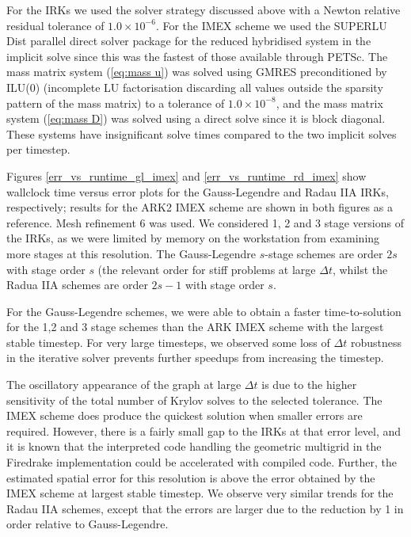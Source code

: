 \documentclass[a4paper, 12pt]{article}
\begin{document}
For the IRKs we used the solver strategy discussed above with a Newton
relative residual tolerance of $1.0\times 10^{-6}$. For the IMEX
scheme we used the SUPERLU Dist parallel direct solver package
\citep{li2023newly,li2003superlu_dist} for the reduced hybridised
system in the implicit solve since this was the fastest of those
available through PETSc. The mass matrix system (\ref{eq:mass u}) was
solved using GMRES preconditioned by ILU(0) (incomplete LU
factorisation discarding all values outside the sparsity pattern of
the mass matrix) to a tolerance of $1.0\times 10^{-8}$, and the mass
matrix system (\ref{eq:mass D}) was solved using a direct solve since
it is block diagonal. These systems have insignificant solve times
compared to the two implicit solves per timestep.

Figures \ref{err_vs_runtime_gl_imex} and \ref{err_vs_runtime_rd_imex}
show wallclock time versus error plots for the Gauss-Legendre and
Radau IIA IRKs, respectively; results for the ARK2 IMEX scheme are
shown in both figures as a reference. Mesh refinement 6 was used. We
considered 1, 2 and 3 stage versions of the IRKs, as we were limited
by memory on the workstation from examining more stages at this
resolution. The Gauss-Legendre $s$-stage schemes are order $2s$ with
stage order $s$ (the relevant order for stiff problems at large
$\Delta t$, whilst the Radua IIA schemes are order $2s-1$ with stage
order $s$.

For the Gauss-Legendre schemes, we were able to obtain a faster
time-to-solution for the 1,2 and 3 stage schemes than the ARK IMEX
scheme with the largest stable timestep.  For very large timesteps, we
observed some loss of $\Delta t$ robustness in the iterative solver
prevents further speedups from increasing the timestep.

The
oscillatory appearance of the graph at large $\Delta t$ is due to the
higher sensitivity of the total number of Krylov solves to the
selected tolerance. The IMEX scheme does produce the quickest solution
when smaller errors are required. However, there is a fairly small gap
to the IRKs at that error level, and it is known that the interpreted
code handling the geometric multigrid in the Firedrake implementation
could be accelerated with compiled code. Further, the estimated
spatial error for this resolution is above the error obtained by the
IMEX scheme at largest stable timestep. We observe very similar trends
for the Radau IIA schemes, except that the errors are larger due to
the reduction by 1 in order relative to Gauss-Legendre.
\end{document}
